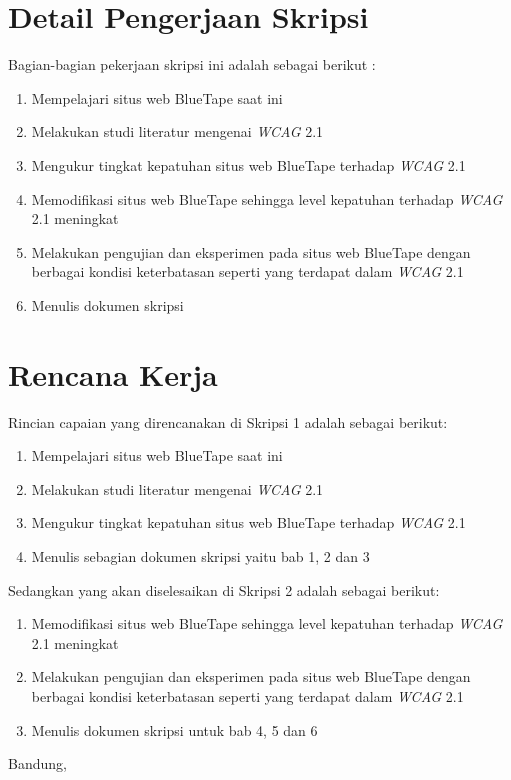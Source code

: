 \documentclass[a4paper,twoside]{article}
\begin{document}
\section{Detail Pengerjaan Skripsi}
Bagian-bagian pekerjaan skripsi ini adalah sebagai berikut :
\begin{enumerate}
	\item Mempelajari situs web BlueTape saat ini
	\item Melakukan studi literatur mengenai \textit{WCAG} 2.1
	\item Mengukur tingkat kepatuhan situs web BlueTape terhadap \textit{WCAG} 2.1
	\item Memodifikasi situs web BlueTape sehingga level kepatuhan terhadap \textit{WCAG} 2.1 meningkat
	\item Melakukan pengujian dan eksperimen pada situs web BlueTape dengan berbagai kondisi keterbatasan seperti yang terdapat dalam \textit{WCAG} 2.1
	\item Menulis dokumen skripsi
\end{enumerate}

\section{Rencana Kerja}
Rincian capaian yang direncanakan di Skripsi 1 adalah sebagai berikut:
\begin{enumerate}
\item Mempelajari situs web BlueTape saat ini
\item Melakukan studi literatur mengenai \textit{WCAG} 2.1
\item Mengukur tingkat kepatuhan situs web BlueTape terhadap \textit{WCAG} 2.1
\item Menulis sebagian dokumen skripsi yaitu bab 1, 2 dan 3
\end{enumerate}

Sedangkan yang akan diselesaikan di Skripsi 2 adalah sebagai berikut:
\begin{enumerate}
\item Memodifikasi situs web BlueTape sehingga level kepatuhan terhadap \textit{WCAG} 2.1 meningkat
\item Melakukan pengujian dan eksperimen pada situs web BlueTape dengan berbagai kondisi keterbatasan seperti yang terdapat dalam \textit{WCAG} 2.1
\item Menulis dokumen skripsi untuk bab 4, 5 dan 6
\end{enumerate}

\vspace{1cm}
\centering Bandung, \tanggal\\
\vspace{2cm} \nama \\ 
\vspace{1cm}
\end{document}
